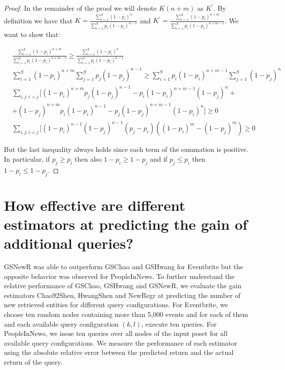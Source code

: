 \begin{proof}
In the remainder of the proof we will denote $K(n+m)$ as $K^{\prime}$. By definition we have that $K = \frac{\sum_{i=1}^S (1-p_i)^n}{\sum_{i=1}^S p_i(1-p_i)^{n-1}}$ and $K^{\prime} = \frac{\sum_{i=1}^S (1-p_i)^{n+m}}{\sum_{i=1}^S p_i(1-p_i)^{n+m-1}}$. We want to show that:

{\small
\begin{align}
&\frac{\sum_{i=1}^S (1-p_i)^{n+m}}{\sum_{i=1}^S p_i(1-p_i)^{n+m-1}} \geq \frac{\sum_{i=1}^S (1-p_i)^n}{\sum_{i=1}^S p_i(1-p_i)^{n-1}} \nonumber \\
&\sum_{i=1}^S (1-p_i)^{n+m}\sum_{j=1}^S p_j(1-p_j)^{n-1} \geq \sum_{i=1}^S p_i(1-p_i)^{n+m-1}\sum_{j=1}^S (1-p_j)^n\nonumber \\
&\sum_{i,j:i\prec j}[(1-p_i)^{n+m}p_j(1-p_j)^{n-1} - p_i(1-p_i)^{n+m-1}(1-p_j)^n + \nonumber \\
& + (1-p_j)^{n+m}p_i(1-p_i)^{n-1} - p_j(1-p_j)^{n+m-1}(1-p_i)^n] \geq 0 \nonumber \\
&\sum_{i,j:i\prec j}[(1-p_i)^{n-1}(1-p_j)^{n-1}(p_j-p_i)((1-p_i)^{m} - (1-p_j)^{m}) \geq 0
\end{align}}

But the last inequality always holds since each term of the summation is positive. In particular, if $p_j \geq p_i$ then
also $1-p_i \geq 1-p_j$ and if $p_j \leq p_i$ then $1-p_i \leq 1-p_j$.
\end{proof}

\section{How effective are different estimators at predicting the gain of additional queries?}
GSNewR was able to outperform GSChao and GSHwang for Eventbrite but the opposite behavior was observed for PeopleInNews. To further understand the relative performance of GSChao, GSHwang and GSNewR, we evaluate the gain estimators Chao92Shen, HwangShen and NewRegr at predicting the number of new retrieved entities for different query configurations. For Eventbrite, we choose ten random nodes containing more than 5,000 events and for each of them and each available query configuration $(k,l)$, execute ten queries. For PeopleInNews, we issue ten queries over all nodes of the input poset for all available query configurations.  We measure the performance of each estimator using the absolute relative error between the predicted return and the actual return of the query.

